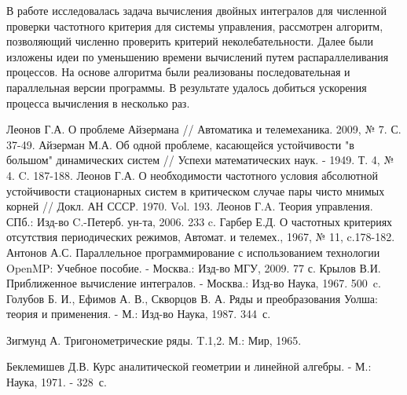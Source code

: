 \documentclass{spisok-article}
\begin{document}
В работе исследовалась задача вычисления двойных интегралов для численной проверки частотного критерия для системы управления, рассмотрен алгоритм, позволяющий численно проверить критерий неколебательности. Далее были изложены идеи по уменьшению времени вычислений путем распараллеливания процессов. На основе алгоритма были реализованы последовательная и параллельная версии программы. В результате  удалось добиться ускорения процесса вычисления в несколько раз.

\renewcommand \refname{Литература}
\begin{thebibliography}{8}

 Леонов Г.А. О проблеме Айзермана // Автоматика и телемеханика.  2009, № 7. 
 С. 37-49.
 Айзерман М.А. Об одной проблеме, касающейся устойчивости "в большом" динамических систем // Успехи математических наук.
- 1949.  Т. 4, № 4.  C. 187-188.
 Леонов Г.А. О необходимости частотного условия абсолютной устойчивости стационарных систем в критическом случае пары чисто мнимых корней // Докл. АН СССР.  1970. 
     Vol. 193.
 Леонов Г.A. Теория управления.  СПб.: Изд-во C.-Петерб. ун-та, 2006.  233 c.
 Гарбер Е.Д. О частотных критериях отсутствия периодических режимов, Автомат. и телемех., 1967, № 11, c.178-182.
 Антонов А.С. Параллельное программирование с использованием технологии OpenMP: Учебное пособие. - Москва.: Изд-во МГУ, 2009.  77 с.
 Крылов В.И. Приближенное вычисление интегралов. - Москва.: Изд-во Наука, 1967.  500~c.
 Голубов Б. И., Ефимов А. В., Скворцов В. А. Ряды и преобразования Уолша: теория и применения. - М.: Изд-во Наука, 1987.  344~с.

 Зигмунд А. Тригонометрические ряды. T.1,2. М.: Мир, 1965.

 Беклемишев Д.В. Курс аналитической геометрии и линейной алгебры. - М.: Наука, 1971. - 328~с.

\end{thebibliography}
\end{document}
